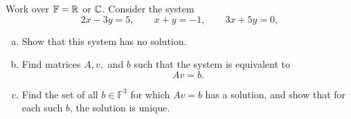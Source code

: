 \begin{exercise}
  \label{ex:hw02:inconsistent-system}
  Work over \(\mathbb F=\mathbb{R}\) or \(\mathbb{C}\). Consider the system
  \[
    2x-3y=5,\qquad x+y=-1,\qquad 3x+5y=0,
  \]
  \begin{enumerate}[(a)][2]
    \item Show that this system has no solution.
    \item Find matrices \(A,v,\) and \(b\) such that the system is
      equivalent to
      \[
        Av=b.
      \]
    \item Find the set of all \(b\in\mathbb F^3\) for which \(Av=b\)
      has a solution, and show that for each such \(b\), the solution
      is unique.
  \end{enumerate}
\end{exercise}
